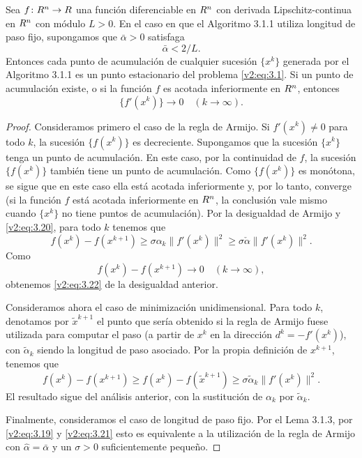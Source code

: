 \begin{theorem}\label{v2:thm:3.1.1}
    Sea $f \colon R^n \to R$ una función diferenciable en $R^n$ con derivada Lipschitz-continua en $R^n$ con módulo $L > 0$. En el caso en que el Algoritmo 3.1.1 utiliza longitud de paso fijo, supongamos que $\bar{\alpha} > 0$ satisfaga
    \begin{equation}
        \bar{\alpha} < 2/L.
        \label{v2:eq:3.21}
    \end{equation}
    Entonces cada punto de acumulación de cualquier sucesión $\{x^k\}$ generada por el Algoritmo 3.1.1 es un punto estacionario del problema \eqref{v2:eq:3.1}. Si un punto de acumulación existe, o si la función $f$ es acotada inferiormente en $R^n$, entonces
    \begin{equation}
        \{f'(x^k)\} \to 0 \quad (k \to \infty).
        \label{v2:eq:3.22}
    \end{equation}
\end{theorem}
\begin{proof}
    Consideramos primero el caso de la regla de Armijo. Si $f'(x^k) \neq 0$ para todo $k$, la sucesión $\{f(x^k)\}$ es decreciente. Supongamos que la sucesión $\{x^k\}$ tenga un punto de acumulación. En este caso, por la continuidad de $f$, la sucesión $\{f(x^k)\}$ también tiene un punto de acumulación. Como $\{f(x^k)\}$ es monótona, se sigue que en este caso ella está acotada inferiormente y, por lo tanto, converge (si la función $f$ está acotada inferiormente en $R^n$, la conclusión vale mismo cuando $\{x^k\}$ no tiene puntos de acumulación). Por la desigualdad de Armijo y \eqref{v2:eq:3.20}, para todo $k$ tenemos que
    \[
        f(x^k) - f(x^{k+1}) \ge \sigma \alpha_k \|f'(x^k)\|^2 \ge \sigma \check{\alpha} \|f'(x^k)\|^2.
    \]
    Como
    \[
        f(x^k) - f(x^{k+1}) \to 0 \quad (k \to \infty),
    \]
    obtenemos \eqref{v2:eq:3.22} de la desigualdad anterior.

    Consideramos ahora el caso de minimización unidimensional. Para todo $k$, denotamos por $\tilde{x}^{k+1}$ el punto que sería obtenido si la regla de Armijo fuese utilizada para computar el paso (a partir de $x^k$ en la dirección $d^k = -f'(x^k)$), con $\tilde{\alpha}_k$ siendo la longitud de paso asociado.
    Por la propia definición de $x^{k+1}$, tenemos que
    \[
        f(x^k) - f(x^{k+1}) \ge f(x^k) - f(\tilde{x}^{k+1}) \ge \sigma \tilde{\alpha}_k \|f'(x^k)\|^2.
    \]
    El resultado sigue del análisis anterior, con la sustitución de $\alpha_k$ por $\tilde{\alpha}_k$.

    Finalmente, consideramos el caso de longitud de paso fijo. Por el Lema 3.1.3, por \eqref{v2:eq:3.19} y \eqref{v2:eq:3.21} esto es equivalente a la utilización de la regla de Armijo con $\hat{\alpha} = \bar{\alpha}$ y un $\sigma > 0$ suficientemente pequeño.
\end{proof}

